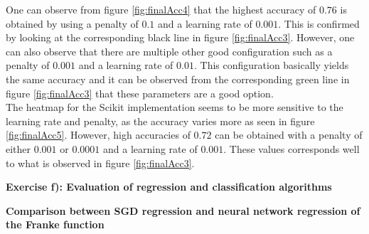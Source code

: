 \documentclass[12pt,a4paper]{article}
\begin{document}
\noindent One can observe from figure \ref{fig:finalAcc4} that the highest accuracy of $0.76$ is obtained by using a penalty of $0.1$ and a learning rate of $0.001$. This is confirmed by looking at the corresponding black line in figure \ref{fig:finalAcc3}. However, one can also observe that there are multiple other good configuration such as a penalty of $0.001$ and a learning rate of $0.01$. This configuration basically yields the same accuracy and it can be observed from the corresponding green line in figure \ref{fig:finalAcc3} that these parameters are a good option.
\\
The heatmap for the Scikit implementation seems to be more sensitive to the learning rate and penalty, as the accuracy varies more as seen in figure \ref{fig:finalAcc5}. However, high accuracies of $0.72$ can be obtained with a penalty of either $0.001$ or $0.0001$ and a learning rate of $0.001$. These values corresponds well to what is observed in figure \ref{fig:finalAcc3}.

\newpage

\begin{center}
\Large{\textbf{Exercise f): Evaluation of regression and classification algorithms}}
\end{center}

\begin{center}
\large{\textbf{Comparison between SGD regression and neural network regression of the Franke function}}
\end{center}
\end{document}
